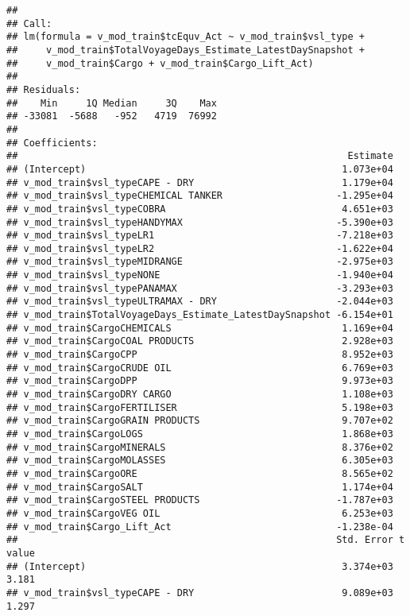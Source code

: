 \documentclass[]{article}
\begin{document}
\begin{verbatim}
## 
## Call:
## lm(formula = v_mod_train$tcEquv_Act ~ v_mod_train$vsl_type + 
##     v_mod_train$TotalVoyageDays_Estimate_LatestDaySnapshot + 
##     v_mod_train$Cargo + v_mod_train$Cargo_Lift_Act)
## 
## Residuals:
##    Min     1Q Median     3Q    Max 
## -33081  -5688   -952   4719  76992 
## 
## Coefficients:
##                                                          Estimate
## (Intercept)                                             1.073e+04
## v_mod_train$vsl_typeCAPE - DRY                          1.179e+04
## v_mod_train$vsl_typeCHEMICAL TANKER                    -1.295e+04
## v_mod_train$vsl_typeCOBRA                               4.651e+03
## v_mod_train$vsl_typeHANDYMAX                           -5.390e+03
## v_mod_train$vsl_typeLR1                                -7.218e+03
## v_mod_train$vsl_typeLR2                                -1.622e+04
## v_mod_train$vsl_typeMIDRANGE                           -2.975e+03
## v_mod_train$vsl_typeNONE                               -1.940e+04
## v_mod_train$vsl_typePANAMAX                            -3.293e+03
## v_mod_train$vsl_typeULTRAMAX - DRY                     -2.044e+03
## v_mod_train$TotalVoyageDays_Estimate_LatestDaySnapshot -6.154e+01
## v_mod_train$CargoCHEMICALS                              1.169e+04
## v_mod_train$CargoCOAL PRODUCTS                          2.928e+03
## v_mod_train$CargoCPP                                    8.952e+03
## v_mod_train$CargoCRUDE OIL                              6.769e+03
## v_mod_train$CargoDPP                                    9.973e+03
## v_mod_train$CargoDRY CARGO                              1.108e+03
## v_mod_train$CargoFERTILISER                             5.198e+03
## v_mod_train$CargoGRAIN PRODUCTS                         9.707e+02
## v_mod_train$CargoLOGS                                   1.868e+03
## v_mod_train$CargoMINERALS                               8.376e+02
## v_mod_train$CargoMOLASSES                               6.305e+03
## v_mod_train$CargoORE                                    8.565e+02
## v_mod_train$CargoSALT                                   1.174e+04
## v_mod_train$CargoSTEEL PRODUCTS                        -1.787e+03
## v_mod_train$CargoVEG OIL                                6.253e+03
## v_mod_train$Cargo_Lift_Act                             -1.238e-04
##                                                        Std. Error t value
## (Intercept)                                             3.374e+03   3.181
## v_mod_train$vsl_typeCAPE - DRY                          9.089e+03   1.297

\end{verbatim}
\end{document}
